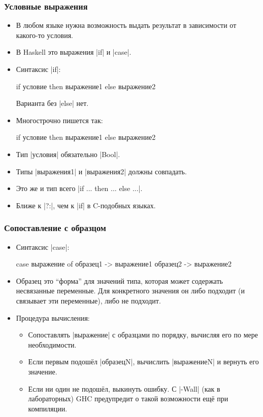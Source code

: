 \documentclass[10pt]{beamer}
\begin{document}
\begin{frame}[fragile]
  \frametitle{Условные выражения}
  \begin{itemize}
    \item В любом языке нужна возможность выдать результат в зависимости от какого-то условия.
    \item В Haskell это выражения \haskinline|if| и \haskinline|case|.
    \item Синтаксис \haskinline|if|:
          \begin{haskell}
            if условие then выражение1 else выражение2
          \end{haskell}
          Варианта без \haskinline|else| нет.
    \item Многострочно пишется так:
          \begin{haskell}
            if условие 
                then выражение1 
                else выражение2
          \end{haskell}
    \item Тип \haskinline|условия| обязательно \haskinline|Bool|.
    \item Типы \haskinline|выражения1| и \haskinline|выражения2| должны совпадать.
    \item Это же и тип всего \haskinline|if ... then ... else ...|.
    \item Ближе к \haskinline|?:|, чем к \haskinline|if| в C-подобных языках.
  \end{itemize}
\end{frame}

\begin{frame}[fragile]
  \frametitle{Сопоставление с образцом}
  \begin{itemize}
    \item Синтаксис \haskinline|case|:
          \begin{haskell}
            case выражение of 
                образец1 -> выражение1 
                образец2 -> выражение2
          \end{haskell}
    \item Образец это \enquote{форма} для значений типа, которая может содержать несвязанные переменные. Для конкретного значения он либо подходит (и связывает эти переменные), либо не подходит.
    \item Процедура вычисления:
          \begin{itemize}
            \item Сопоставлять \haskinline|выражение| с образцами по порядку, вычисляя его по мере необходимости.
            \item Если первым подошёл \haskinline|образецN|, вычислить \haskinline|выражениеN| и вернуть его значение.
            \item Если ни один не подошёл, выкинуть ошибку. С \ghcinline|-Wall| (как в лабораторных) GHC предупредит о такой возможности ещё при компиляции.
          \end{itemize}
  \end{itemize}
\end{frame}
\end{document}
